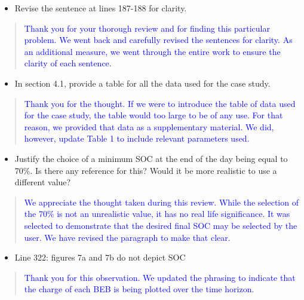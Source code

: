 \documentclass[11pt,a4paper,final]{article}
\begin{document}
\begin{itemize}
\item Revise the sentence at lines 187-188 for clarity.
\end{itemize}

\begin{quote}
  \textcolor{blue}{Thank you for your thorough review and for finding this particular problem. We went back and carefully revised the sentences for clarity. As an additional measure, we went through the entire work to ensure the clarity of each sentence.}
\end{quote}

\begin{itemize}
\item In section 4.1, provide a table for all the data used for the case study.
\end{itemize}

\begin{quote}
  \textcolor{blue}{Thank you for the thought. If we were to introduce the table of data used for the case study, the table would too large to be of any use. For that reason, we provided that data as a supplementary material. We did, however, update Table 1 to include relevant parameters used.}
\end{quote}

\begin{itemize}
\item Justify the choice of a minimum SOC at the end of the day being equal to 70\%. Is there any reference for this? Would it be more realistic to use a different value?
\end{itemize}

\begin{quote}
  \textcolor{blue}{We appreciate the thought taken during this review. While the selection of the 70\% is not an unrealistic value, it has no real life significance. It was selected to demonstrate that the desired final SOC may be selected by the user. We have revised the paragraph to make that clear.}
\end{quote}

\begin{itemize}
\item Line 322: figures 7a and 7b do not depict SOC
\end{itemize}

\begin{quote}
  \textcolor{blue}{Thank you for this observation. We updated the phrasing to indicate that the charge of each BEB is being plotted over the time horizon.}
\end{quote}
\end{document}
